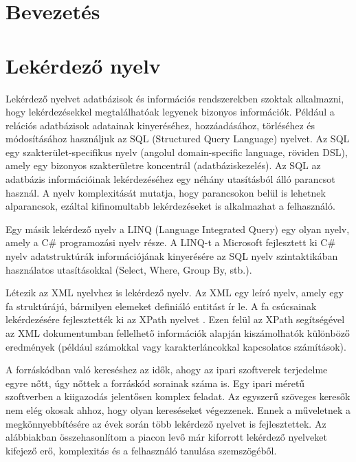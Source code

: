 \documentclass[a4paper,12pt]{report}
\begin{document}
\chapter{Bevezetés}


\chapter{Lekérdező nyelv}
Lekérdező nyelvet adatbázisok és információs rendszerekben szoktak alkalmazni, hogy lekérdezésekkel megtalálhatóak legyenek bizonyos információk.  Például a relációs adatbázisok adatainak kinyeréséhez, hozzáadásához, törléséhez és módosításához használjuk az SQL (Structured Query Language) nyelvet. Az SQL egy szakterület-specifikus nyelv (angolul domain-specific language, röviden DSL), amely egy bizonyos szakterületre koncentrál (adatbáziskezelés). Az SQL az adatbázis információinak lekérdezéséhez egy néhány utasításból álló parancsot használ. A nyelv komplexitását mutatja, hogy parancsokon belül is lehetnek alparancsok, ezáltal kifinomultabb lekérdezéseket is alkalmazhat a felhasználó. 
\par Egy másik lekérdező nyelv a LINQ (Language Integrated Query) egy olyan nyelv, amely a C\# programozási nyelv része. A LINQ-t a Microsoft fejlesztett ki C\# nyelv adatstruktúrák információjának kinyerésére az SQL nyelv szintaktikában használatos utasításokkal (Select, Where, Group By, stb.).
\par Létezik az XML nyelvhez is lekérdező nyelv. Az XML egy leíró nyelv, amely egy fa struktúrájú, bármilyen elemeket definiáló entitást ír le. A fa csúcsainak lekérdezésére fejlesztették ki az XPath nyelvet \cite{xpath}. Ezen felül az XPath segítségével az XML dokumentumban fellelhető információk alapján kiszámolhatók különböző eredmények (például számokkal vagy karakterláncokkal kapcsolatos számítások).
\par A forráskódban való kereséshez az idők, ahogy az ipari szoftverek terjedelme egyre nőtt, úgy nőttek a forráskód sorainak száma is. Egy ipari méretű szoftverben a kiigazodás jelentősen komplex feladat. Az egyszerű szöveges keresők nem elég okosak ahhoz, hogy olyan kereséseket végezzenek. Ennek a műveletnek a megkönnyebbítésére az évek során több lekérdező nyelvet is fejlesztettek. Az alábbiakban összehasonlítom a piacon levő már kiforrott lekérdező nyelveket kifejező erő, komplexitás és a felhasználó tanulása szemszögéből.
\end{document}
